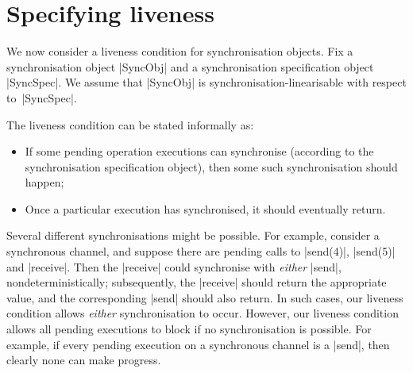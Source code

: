 \section{Specifying liveness}
\label{sec:progress}

We now consider a liveness condition for synchronisation objects.  Fix a
synchronisation object |SyncObj| and a synchronisation specification object
|SyncSpec|.  We assume that |SyncObj| is synchronisation-linearisable with
respect to~|SyncSpec|.

The liveness condition can be stated informally as:
%
\begin{itemize}
\item If some pending operation executions can synchronise (according to the
  synchronisation specification object), then some such synchronisation should
  happen;

\item Once a particular execution has synchronised, it should eventually
  return.
\end{itemize}
%
Several different synchronisations might be possible.  For example,
consider a synchronous channel, and suppose there are pending calls to
|send(4)|, |send(5)| and |receive|.  Then the |receive| could synchronise with
\emph{either} |send|, nondeterministically; subsequently, the |receive| should
return the appropriate value, and the corresponding |send| should also return.
In such cases, our liveness condition allows \emph{either} synchronisation to
occur.
%
However, our liveness condition allows all pending executions to block if no
synchronisation is possible.  For example, if every pending execution on a
synchronous channel is a |send|, then clearly none can make progress.


